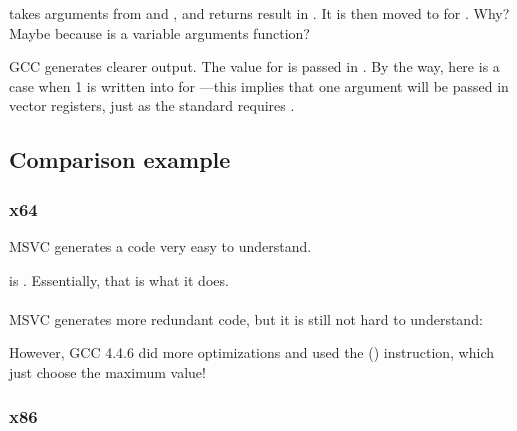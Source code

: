  takes arguments from  and , and returns result in .
It is then moved to \RDX for \printf. 
Why? 
Maybe because 
\printf\EMDASH{}is a variable arguments function?



GCC generates clearer output. 
The value for \printf is passed in . 
By the way, here is a case when 1 is written into \EAX
for \printf ---this implies that one argument will be passed in vector registers,
just as the standard requires \SysVABI.

\subsection{Comparison example}



\subsubsection{x64}



\Optimizing MSVC generates a code very easy to understand.

 is . Essentially, that is what it does.\\
\\
\NonOptimizing MSVC generates more redundant code,
but it is still not hard to understand:



However, GCC 4.4.6 
did more optimizations and used the  () instruction,
which just choose the maximum value!



\clearpage
\subsubsection{x86}

